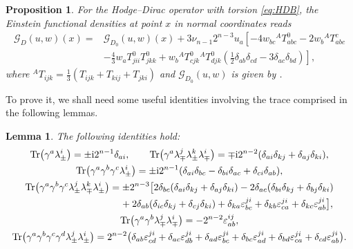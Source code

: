 \documentclass[10pt,a4paper]{amsart}
\numberwithin{equation}{section}
\newtheorem{Lemma}[Theorem]{Lemma}
\newtheorem{Proposition}[Theorem]{Proposition}
\theoremstyle{definition}
\def\Tr{\mathrm{Tr}}
\begin{document}
\begin{Proposition}\label{prop:Ein_HD}
For the Hodge--Dirac operator with torsion \eqref{eq:HDB}, the Einstein functional densities at point $x$ in normal coordinates reads
\begin{align*}%
\mathscr{G}_D(u,w)(x)={}&\mathscr{G}_{D_0}(u,w)(x)
			+ 3\nu_{n-1}2^{n-3} u_a\left[-4w_{bc}{}^AT^{0}_{abc}-2w_b {}^AT^{c}_{abc}\right. \\
 &\left.-\frac{4}{3}w_a T^0_{jii}T^{0}_{jkk} +w_b {}^AT^{0}_{cjk} {}^AT^{0}_{djk}\left(\frac{1}{2}\delta_{ab}\delta_{cd}-3\delta_{ac}\delta_{bd}\right) \right],
		\end{align*}
where ${}^AT_{ijk}=\frac{1}{3}(T_{ijk}+T_{kij}+T_{jki})$ and $\mathscr{G}_{D_0}(u,w)$ is given by {\rm\cite[\emph{Proposition}~3.3]{dabrowski2024}}.
\end{Proposition}
To prove it, we shall need some useful identities involving the trace comprised in the following lemmas.
\begin{Lemma}
	The following identities hold:
	\begin{gather*}
				 \Tr\bigl(\gamma^a \lambda^i_{\pm}\bigr)=\pm{\rm i} 2^{n-1}\delta_{ai}, \qquad
			 \Tr\bigl(\gamma^a \lambda^j_{\mp}\lambda^k_{\pm}\lambda^i_{\mp}\bigr)=\mp{\rm i} 2^{n-2}(\delta_{ai}\delta_{kj}+\delta_{aj}\delta_{ki}), \\
			 \Tr\bigl(\gamma^a\gamma^b \gamma^c \lambda^i_{\pm}\bigr)=\pm{\rm i} 2^{n-1}(\delta_{ai}\delta_{bc}-\delta_{bi}\delta_{ac}+\delta_{ci}\delta_{ab}), \\
				\Tr\bigl(\gamma^a\gamma^b\gamma^c \lambda^j_{\pm}\lambda^k_{\mp}\lambda^i_{\pm}\bigr)=\pm 2^{n-3}\bigl[2\delta_{bc}(\delta_{ai}\delta_{kj}+\delta_{aj}\delta_{ki})-2\delta_{ac}(\delta_{bi}\delta_{kj}+\delta_{bj}\delta_{ki})\\
		\phantom{\Tr\bigl(\gamma^a\gamma^b\gamma^c \lambda^j_{\pm}\lambda^k_{\mp}\lambda^i_{\pm}\bigr)=}{}
+2\delta_{ab}(\delta_{ic}\delta_{kj}+\delta_{cj}\delta_{ki})+\delta_{ka}\varepsilon^{ji}_{bc}+\delta_{kb}\varepsilon^{ji}_{ca}+\delta_{kc}\varepsilon^{ji}_{ab}\bigr],
 \\
			 \Tr\bigl(\gamma^a\gamma^b \lambda^j_{\mp}\lambda^i_{\mp}\bigr)=-2^{n-2}\varepsilon^{ij}_{ab}, \\
			 \Tr\bigl(\gamma^a\gamma^b\gamma^c\gamma^d \lambda^j_{\pm}\lambda^i_{\pm}\bigr)=2^{n-2}\bigl(\delta_{ab}\varepsilon^{ji}_{cd}+\delta_{ac}\varepsilon^{ji}_{db}+\delta_{ad}\varepsilon^{ji}_{bc}
+\delta_{bc}\varepsilon^{ji}_{ad}+\delta_{bd}\varepsilon^{ji}_{ca}+\delta_{cd}\varepsilon^{ji}_{ab}\bigr).	
	\end{gather*}
\end{Lemma}
\end{document}
